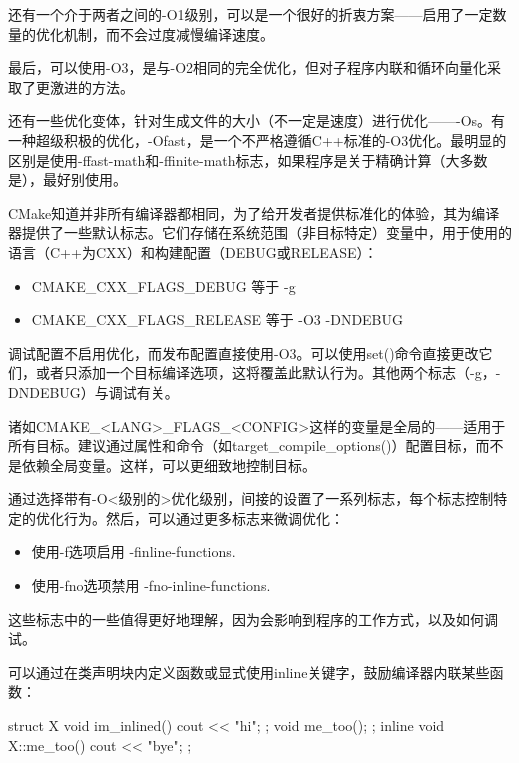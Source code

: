还有一个介于两者之间的-O1级别，可以是一个很好的折衷方案——启用了一定数量的优化机制，而不会过度减慢编译速度。

最后，可以使用-O3，是与-O2相同的完全优化，但对子程序内联和循环向量化采取了更激进的方法。

还有一些优化变体，针对生成文件的大小（不一定是速度）进行优化——-Os。有一种超级积极的优化，-Ofast，是一个不严格遵循C++标准的-O3优化。最明显的区别是使用-ffast-math和-ffinite-math标志，如果程序是关于精确计算（大多数是），最好别使用。

CMake知道并非所有编译器都相同，为了给开发者提供标准化的体验，其为编译器提供了一些默认标志。它们存储在系统范围（非目标特定）变量中，用于使用的语言（C++为CXX）和构建配置（DEBUG或RELEASE）：

\begin{itemize}
\item
CMAKE\_CXX\_FLAGS\_DEBUG 等于 -g

\item
CMAKE\_CXX\_FLAGS\_RELEASE 等于 -O3 -DNDEBUG
\end{itemize}

调试配置不启用优化，而发布配置直接使用-O3。可以使用set()命令直接更改它们，或者只添加一个目标编译选项，这将覆盖此默认行为。其他两个标志（-g，-DNDEBUG）与调试有关。

诸如CMAKE\_<LANG>\_FLAGS\_<CONFIG>这样的变量是全局的——适用于所有目标。建议通过属性和命令（如target\_compile\_options()）配置目标，而不是依赖全局变量。这样，可以更细致地控制目标。

通过选择带有-O<级别的>优化级别，间接的设置了一系列标志，每个标志控制特定的优化行为。然后，可以通过更多标志来微调优化：

\begin{itemize}
\item
使用-f选项启用 -finline-functions.

\item
使用-fno选项禁用 -fno-inline-functions.
\end{itemize}

这些标志中的一些值得更好地理解，因为会影响到程序的工作方式，以及如何调试。


可以通过在类声明块内定义函数或显式使用inline关键字，鼓励编译器内联某些函数：

\begin{cpp}
struct X {
    void im_inlined(){ cout << "hi\n"; };
    void me_too();
};
inline void X::me_too() { cout << "bye\n"; };
\end{cpp}

